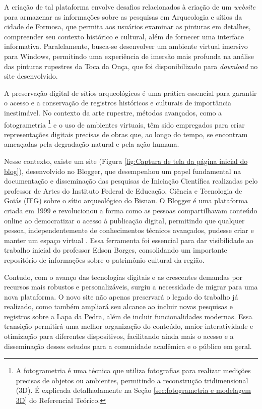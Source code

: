 A criação de tal plataforma envolve desafios relacionados à criação de um \textit{website} para armazenar as informações sobre as pesquisas em Arqueologia e sítios da cidade de Formosa, que permita aos usuários examinar as pinturas em detalhes, compreender seu contexto histórico e cultural, além de fornecer uma interface informativa. Paralelamente, busca-se desenvolver um ambiente virtual imersivo para Windows, permitindo uma experiência de imersão mais profunda na análise das pinturas rupestres da Toca da Onça, que foi disponibilizado para \textit{download} no site desenvolvido. 

A preservação digital de sítios arqueológicos é uma prática essencial para garantir o acesso e a conservação de registros históricos e culturais de importância inestimável. No contexto da arte rupestre, métodos avançados, como a fotogrametria \footnote{A fotogrametria é uma técnica que utiliza fotografias para realizar medições precisas de objetos ou ambientes, permitindo a reconstrução tridimensional (3D). É explicada detalhadamente na Seção \ref{sec:fotogrametria e modelagem 3D} do Referencial Teórico.} e o uso de ambientes virtuais, têm sido empregados para criar representações digitais precisas de obras que, ao longo do tempo, se encontram ameaçadas pela degradação natural e pela ação humana.

Nesse contexto, existe um site (Figura \ref{fig:Captura de tela da página inicial do blog}), desenvolvido no Blogger, que desempenhou um papel fundamental na documentação e disseminação das pesquisas de Iniciação Científica realizadas pelo professor de Artes do Instituto Federal de Educação, Ciência e Tecnologia de Goiás (IFG) sobre o sítio arqueológico do Bisnau. O Blogger é uma plataforma criada em 1999 e revolucionou a forma como as pessoas compartilhavam conteúdo online ao democratizar o acesso à publicação digital, permitindo que qualquer pessoa, independentemente de conhecimentos técnicos avançados, pudesse criar e manter um espaço virtual \citep{BALLARD2012105}. Essa ferramenta foi essencial para dar visibilidade ao trabalho inicial do professor Edson Borges, consolidando um importante repositório de informações sobre o patrimônio cultural da região.

Contudo, com o avanço das tecnologias digitais e as crescentes demandas por recursos mais robustos e personalizáveis, surgiu a necessidade de migrar para uma nova plataforma. O novo site não apenas preservará o legado do trabalho já realizado, como também ampliará seu alcance ao incluir novas pesquisas e registros sobre a Lapa da Pedra, além de incluir funcionalidades modernas. Essa transição permitirá uma melhor organização do conteúdo, maior interatividade e otimização para diferentes dispositivos, facilitando ainda mais o acesso e a disseminação desses estudos para a comunidade acadêmica e o público em geral.

